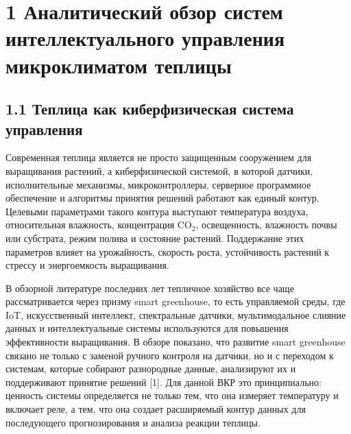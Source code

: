 \documentclass[a4paper,14pt]{extarticle}
\begin{document}
\hypertarget{ux430ux43dux430ux43bux438ux442ux438ux447ux435ux441ux43aux438ux439-ux43eux431ux437ux43eux440-ux441ux438ux441ux442ux435ux43c-ux438ux43dux442ux435ux43bux43bux435ux43aux442ux443ux430ux43bux44cux43dux43eux433ux43e-ux443ux43fux440ux430ux432ux43bux435ux43dux438ux44f-ux43cux438ux43aux440ux43eux43aux43bux438ux43cux430ux442ux43eux43c-ux442ux435ux43fux43bux438ux446ux44b}{%
\section{1 Аналитический обзор систем интеллектуального управления
микроклиматом
теплицы}\label{ux430ux43dux430ux43bux438ux442ux438ux447ux435ux441ux43aux438ux439-ux43eux431ux437ux43eux440-ux441ux438ux441ux442ux435ux43c-ux438ux43dux442ux435ux43bux43bux435ux43aux442ux443ux430ux43bux44cux43dux43eux433ux43e-ux443ux43fux440ux430ux432ux43bux435ux43dux438ux44f-ux43cux438ux43aux440ux43eux43aux43bux438ux43cux430ux442ux43eux43c-ux442ux435ux43fux43bux438ux446ux44b}}

\hypertarget{ux442ux435ux43fux43bux438ux446ux430-ux43aux430ux43a-ux43aux438ux431ux435ux440ux444ux438ux437ux438ux447ux435ux441ux43aux430ux44f-ux441ux438ux441ux442ux435ux43cux430-ux443ux43fux440ux430ux432ux43bux435ux43dux438ux44f}{%
\subsection{1.1 Теплица как киберфизическая система
управления}\label{ux442ux435ux43fux43bux438ux446ux430-ux43aux430ux43a-ux43aux438ux431ux435ux440ux444ux438ux437ux438ux447ux435ux441ux43aux430ux44f-ux441ux438ux441ux442ux435ux43cux430-ux443ux43fux440ux430ux432ux43bux435ux43dux438ux44f}}

Современная теплица является не просто защищенным сооружением для
выращивания растений, а киберфизической системой, в которой датчики,
исполнительные механизмы, микроконтроллеры, серверное программное
обеспечение и алгоритмы принятия решений работают как единый контур.
Целевыми параметрами такого контура выступают температура воздуха,
относительная влажность, концентрация CO\(_2\), освещенность, влажность
почвы или субстрата, режим полива и состояние растений. Поддержание этих
параметров влияет на урожайность, скорость роста, устойчивость растений
к стрессу и энергоемкость выращивания.

В обзорной литературе последних лет тепличное хозяйство все чаще
рассматривается через призму smart greenhouse, то есть управляемой
среды, где IoT, искусственный интеллект, спектральные датчики,
мультимодальное слияние данных и интеллектуальные системы используются
для повышения эффективности выращивания. В обзоре показано, что развитие
smart greenhouse связано не только с заменой ручного контроля на
датчики, но и с переходом к системам, которые собирают разнородные
данные, анализируют их и поддерживают принятие решений {[}1{]}. Для
данной ВКР это принципиально: ценность системы определяется не только
тем, что она измеряет температуру и включает реле, а тем, что она
создает расширяемый контур данных для последующего прогнозирования и
анализа реакции теплицы.
\end{document}
